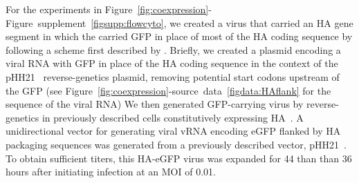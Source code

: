 \documentclass[9pt,lineno]{elife}
\begin{document}
For the experiments in Figure~\ref{fig:coexpression}-Figure~supplement~\ref{figsupp:flowcyto}, we created a virus that carried an HA gene segment in which the carried GFP in place of most of the HA coding sequence by following a scheme first described by \citet{marsh2007specific}.
Briefly, we created a plasmid encoding a viral RNA with GFP in place of the HA coding sequence in the context of the pHH21~\citep{Neumann:1999ws} reverse-genetics plasmid, removing potential start codons upstream of the GFP (see Figure~\ref{fig:coexpression}-source~data~\ref{figdata:HAflank} for the sequence of the viral RNA)
We then generated GFP-carrying virus by reverse-genetics in previously described cells constitutively expressing HA~\citep{Doud:2016gm}.
A unidirectional vector for generating viral vRNA encoding eGFP flanked by HA packaging sequences was generated from a previously described vector, pHH21~\citep{Neumann:1999ws}. 
To obtain sufficient titers, this HA-eGFP virus was expanded for 44 than than 36 hours after initiating infection at an MOI of 0.01.
\end{document}
